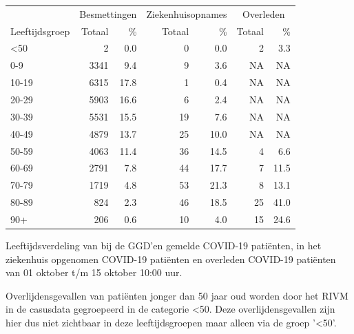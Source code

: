 \documentclass[
  english,
  man,floatsintext]{apa6}
\begin{document}
\begin{table}
\centering\begingroup\fontsize{11}{13}\selectfont

\begin{threeparttable}
\begin{tabular}{lrrrrrr}
\toprule
\multicolumn{1}{c}{ } & \multicolumn{2}{c}{Besmettingen} & \multicolumn{2}{c}{Ziekenhuisopnames} & \multicolumn{2}{c}{Overleden} \\
\cmidrule(l{3pt}r{3pt}){2-3} \cmidrule(l{3pt}r{3pt}){4-5} \cmidrule(l{3pt}r{3pt}){6-7}
Leeftijdsgroep & Totaal & \% & Totaal & \% & Totaal & \%\\
\midrule
<50 & 2 & 0.0 & 0 & 0.0 & 2 & 3.3\\
0-9 & 3341 & 9.4 & 9 & 3.6 & NA & NA\\
10-19 & 6315 & 17.8 & 1 & 0.4 & NA & NA\\
20-29 & 5903 & 16.6 & 6 & 2.4 & NA & NA\\
30-39 & 5531 & 15.5 & 19 & 7.6 & NA & NA\\
40-49 & 4879 & 13.7 & 25 & 10.0 & NA & NA\\
50-59 & 4063 & 11.4 & 36 & 14.5 & 4 & 6.6\\
60-69 & 2791 & 7.8 & 44 & 17.7 & 7 & 11.5\\
70-79 & 1719 & 4.8 & 53 & 21.3 & 8 & 13.1\\
80-89 & 824 & 2.3 & 46 & 18.5 & 25 & 41.0\\
90+ & 206 & 0.6 & 10 & 4.0 & 15 & 24.6\\
\bottomrule
\end{tabular}
\begin{tablenotes}
\item[1] Leeftijdsverdeling van bij de GGD’en gemelde COVID-19 patiënten, in het ziekenhuis opgenomen COVID-19 patiënten en overleden COVID-19 patiënten van 01 oktober t/m 15 oktober 10:00 uur.
\item[2] Overlijdensgevallen van patiënten jonger dan 50 jaar oud worden door het RIVM in de casusdata gegroepeerd in de categorie <50. Deze overlijdensgevallen zijn hier dus niet zichtbaar in deze leeftijdsgroepen maar alleen via de groep '<50'.
\end{tablenotes}
\end{threeparttable}
\endgroup{}
\end{table}

\newpage
\end{document}
